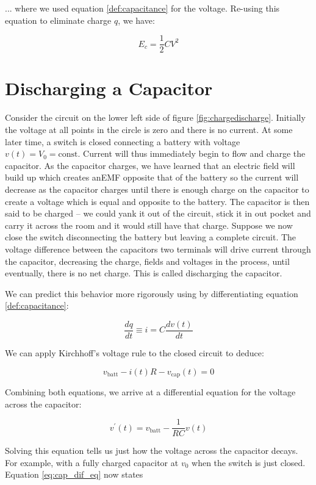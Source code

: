 \documentclass{tufte-book}
\begin{document}
\noindent ... where we used equation \ref{def:capacitance} for the voltage. Re-using this equation to eliminate charge $q$, we have:

\begin{equation}\label{eq:energy_capacitor}
E_c=\frac{1}{2}CV^2
\end{equation}

\section{Discharging a Capacitor}

Consider the circuit on the lower left side of figure \ref{fig:chargedischarge}. Initially the voltage at all points in the circle is zero and there is no current. At some later time, a switch is closed connecting a battery with voltage $v(t) = V_0 =  \text{const}$. Current will thus immediately begin to flow and charge the capacitor. As the capacitor charges, we have learned that an electric field will build up which creates anEMF opposite that of the battery so the current will decrease as the capacitor charges until there is enough charge on the capacitor to create a voltage which is equal and opposite to the battery. The capacitor is then said to be charged -- we could yank it out of the circuit, stick it in out pocket and carry it across the room and it would still have that charge. Suppose we now close the switch disconnecting the battery but leaving a complete circuit. The voltage difference between the capacitors two terminals will drive current through the capacitor, decreasing the charge, fields and voltages in the process, until eventually, there is no net charge. This is called discharging the capacitor.

We can predict this behavior more rigorously using by differentiating equation \ref{def:capacitance}:

$$
\frac{dq}{dt} \equiv i = C\frac{dv(t)}{dt}
$$

\noindent We can apply Kirchhoff's voltage rule to the closed circuit to deduce:

$$
v_{\text{batt}} -i(t)R - v_{\text{cap}}(t) = 0
$$

Combining both equations, we arrive at a differential equation for the voltage across the capacitor:


\begin{equation}\label{eq:cap_dif_eq}
v^\prime(t) =v_{\text{batt}} -\frac{1}{RC}v(t)
\end{equation}

Solving this equation tells us just how the voltage across the capacitor decays. For example, with a fully charged capacitor at $v_0$ when the switch is just closed. Equation \ref{eq:cap_dif_eq} now states
\end{document}
